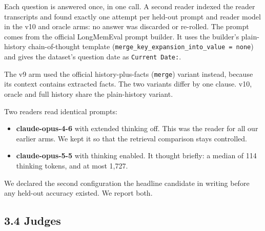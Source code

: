 \documentclass[11pt]{article}
\providecommand{\tightlist}{\setlength{\itemsep}{0pt}\setlength{\parskip}{0pt}}
\begin{document}
Each question is answered once, in one call. A second reader indexed the reader transcripts and found
exactly one attempt per held-out prompt and reader model in the v10 and oracle arms: no answer was
discarded or re-rolled. The prompt comes from the official LongMemEval prompt builder.
It uses the builder's plain-history chain-of-thought template (\texttt{merge\_key\_expansion\_into\_value\ =\ none}) and
gives the dataset's question date as \texttt{Current\ Date:}.

The v9 arm used the official history-plus-facts (\texttt{merge}) variant instead, because its context contains
extracted facts. The two variants differ by one clause. v10, oracle and full history share the
plain-history variant.

Two readers read identical prompts:

\begin{itemize}
\tightlist
\item
  \textbf{claude-opus-4-6} with extended thinking off. This was the reader for all our earlier arms. We kept it
  so that the retrieval comparison stays controlled.
\item
  \textbf{claude-opus-5-5} with thinking enabled. It thought briefly: a median of 114 thinking tokens, and at
  most 1,727.
\end{itemize}

We declared the second configuration the headline candidate in writing before any held-out accuracy
existed. We report both.

\hypertarget{judges}{%
\subsection{3.4 Judges}\label{judges}}
\end{document}
